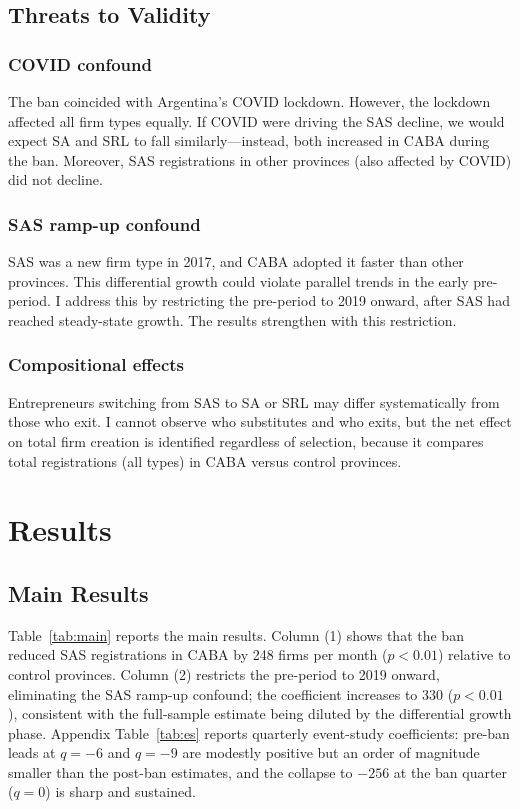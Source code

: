 \documentclass[12pt]{article}
\begin{document}
\subsection{Threats to Validity}

\subsubsection*{COVID confound} The ban coincided with Argentina's COVID lockdown. However, the lockdown affected all firm types equally. If COVID were driving the SAS decline, we would expect SA and SRL to fall similarly---instead, both increased in CABA during the ban. Moreover, SAS registrations in other provinces (also affected by COVID) did not decline.

\subsubsection*{SAS ramp-up confound} SAS was a new firm type in 2017, and CABA adopted it faster than other provinces. This differential growth could violate parallel trends in the early pre-period. I address this by restricting the pre-period to 2019 onward, after SAS had reached steady-state growth. The results strengthen with this restriction.

\subsubsection*{Compositional effects} Entrepreneurs switching from SAS to SA or SRL may differ systematically from those who exit. I cannot observe who substitutes and who exits, but the net effect on total firm creation is identified regardless of selection, because it compares total registrations (all types) in CABA versus control provinces.


\section{Results}

\subsection{Main Results}



Table~\ref{tab:main} reports the main results. Column (1) shows that the ban reduced SAS registrations in CABA by 248 firms per month ($p < 0.01$) relative to control provinces. Column (2) restricts the pre-period to 2019 onward, eliminating the SAS ramp-up confound; the coefficient increases to 330 ($p < 0.01$), consistent with the full-sample estimate being diluted by the differential growth phase. Appendix Table~\ref{tab:es} reports quarterly event-study coefficients: pre-ban leads at $q = -6$ and $q = -9$ are modestly positive but an order of magnitude smaller than the post-ban estimates, and the collapse to $-256$ at the ban quarter ($q = 0$) is sharp and sustained.
\end{document}

